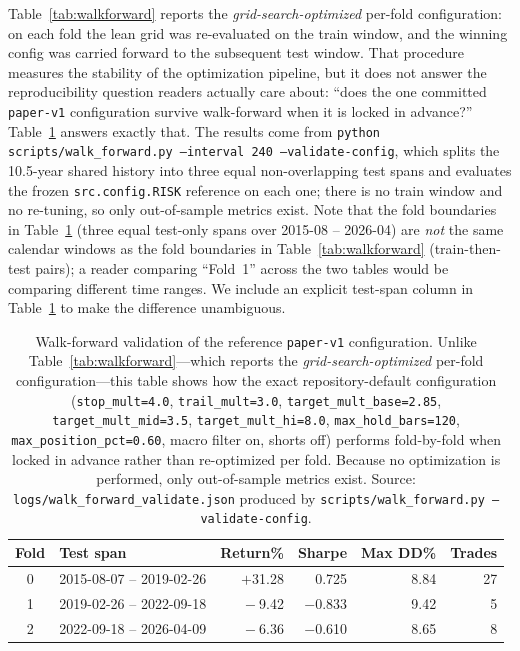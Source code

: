 \documentclass{article}
\begin{document}
Table~\ref{tab:walkforward} reports the \emph{grid-search-optimized} per-fold configuration: on each fold the lean grid was re-evaluated on the train window, and the winning config was carried forward to the subsequent test window.
That procedure measures the stability of the optimization pipeline, but it does not answer the reproducibility question readers actually care about: ``does the one committed \texttt{paper-v1} configuration survive walk-forward when it is locked in advance?''
Table~\ref{tab:walkforward_validate} answers exactly that.
The results come from \texttt{python scripts/walk\_forward.py --interval 240 --validate-config}, which splits the 10.5-year shared history into three equal non-overlapping test spans and evaluates the frozen \texttt{src.config.RISK} reference on each one; there is no train window and no re-tuning, so only out-of-sample metrics exist.
Note that the fold boundaries in Table~\ref{tab:walkforward_validate} (three equal test-only spans over 2015-08 -- 2026-04) are \emph{not} the same calendar windows as the fold boundaries in Table~\ref{tab:walkforward} (train-then-test pairs); a reader comparing ``Fold~1'' across the two tables would be comparing different time ranges. We include an explicit test-span column in Table~\ref{tab:walkforward_validate} to make the difference unambiguous.

\begin{table}[h]
\centering
\caption{Walk-forward validation of the reference \texttt{paper-v1} configuration. Unlike Table~\ref{tab:walkforward}---which reports the \emph{grid-search-optimized} per-fold configuration---this table shows how the exact repository-default configuration (\texttt{stop\_mult=4.0}, \texttt{trail\_mult=3.0}, \texttt{target\_mult\_base=2.85}, \texttt{target\_mult\_mid=3.5}, \texttt{target\_mult\_hi=8.0}, \texttt{max\_hold\_bars=120}, \texttt{max\_position\_pct=0.60}, macro filter on, shorts off) performs fold-by-fold when locked in advance rather than re-optimized per fold. Because no optimization is performed, only out-of-sample metrics exist. Source: \texttt{logs/walk\_forward\_validate.json} produced by \texttt{scripts/walk\_forward.py --validate-config}.}
\label{tab:walkforward_validate}
\small
\begin{tabular}{@{}clrrrr@{}}
\toprule
\textbf{Fold} & \textbf{Test span} & \textbf{Return\%} & \textbf{Sharpe} & \textbf{Max DD\%} & \textbf{Trades} \\
\midrule
0 & 2015-08-07 -- 2019-02-26 & $+$31.28 & $\;\;$0.725 & 8.84 & 27 \\
1 & 2019-02-26 -- 2022-09-18 & $\phantom{+}-$9.42 & $-$0.833 & 9.42 & \phantom{0}5 \\
2 & 2022-09-18 -- 2026-04-09 & $\phantom{+}-$6.36 & $-$0.610 & 8.65 & \phantom{0}8 \\
\bottomrule
\end{tabular}
\end{table}
\end{document}
